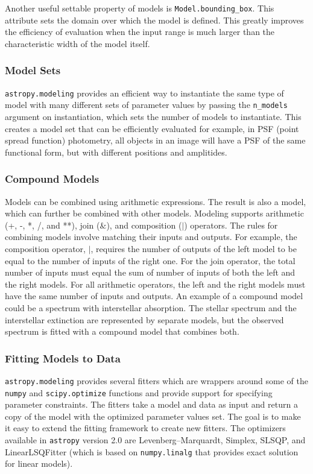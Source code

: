 \documentclass[modern]{aastex61}
\newcommand{\package}[1]{\texttt{#1}\xspace}
\newcommand{\astropypkg}{\package{astropy}}
\begin{document}
Another useful settable property of models is \texttt{Model.bounding\_box}. This attribute sets the domain over which the model is defined. This greatly improves the efficiency of evaluation when the input range is much larger than the characteristic width of the model itself.

\subsubsection{Model Sets}

\package{astropy.modeling} provides an efficient way to instantiate the same type of model with many different sets of parameter values by passing the \texttt{n\_models} argument on instantiation, which sets the number of models to instantiate. This creates a model set that can be efficiently evaluated for example, in PSF (point spread function) photometry, all objects in an image will have a PSF of the same functional form, but with different positions and amplitides.

\subsubsection{Compound Models}
Models can be combined using arithmetic expressions. The result is also a model, which can further be combined with other models. Modeling supports arithmetic (+, -, *, /, and **), join ($\&$), and composition ($|$) operators. The rules for combining models involve matching their inputs and outputs. For example, the composition operator, $|$, requires the number of outputs of the left model to be equal to the number of inputs of the right one. For the join operator, the total number of inputs must equal the sum of number of inputs of both the left and the right models. For all arithmetic operators, the left and the right models must have the same number of inputs and outputs. An example of a compound model could be a spectrum with interstellar absorption. The stellar spectrum and the interstellar extinction are represented by separate models, but the observed spectrum is fitted with a compound model that combines both.

\subsubsection{Fitting Models to Data}

\package{astropy.modeling} provides several fitters which are wrappers around some of the \texttt{numpy} and \texttt{scipy.optimize} functions and provide support for specifying parameter constraints. The fitters take a model and data as input and return a copy of the model with the optimized parameter values set. The goal is to make it easy to extend the fitting framework to create new fitters. The optimizers available in \astropypkg version 2.0 are Levenberg--Marquardt, Simplex, SLSQP, and LinearLSQFitter (which is based on \texttt{numpy.linalg} that provides exact solution for linear models).
\end{document}
